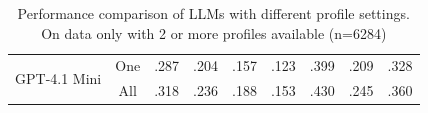 \begin{table}
\begin{tabular}{lcccccccc}
\midrule
\multirow{2}{*}{GPT-4.1 Mini}  
 & \cellcolor{lightgreen}One & \cellcolor{lightgreen}.287 & \cellcolor{lightgreen}.204 & \cellcolor{lightgreen}.157 & \cellcolor{lightgreen}.123 & \cellcolor{lightgreen}.399 & \cellcolor{lightgreen}.209 & \cellcolor{lightgreen}.328 \\ 
 & \cellcolor{darkgreen}All & \cellcolor{darkgreen}.318 & \cellcolor{darkgreen}.236 & \cellcolor{darkgreen}.188 & \cellcolor{darkgreen}.153 & \cellcolor{darkgreen}.430 & \cellcolor{darkgreen}.245 & \cellcolor{darkgreen}.360 \\ 
\bottomrule
\end{tabular}
\caption{Performance comparison of LLMs with different profile settings. On data only with 2 or more profiles available (n=6284)}
\label{tab:main-result-2more}
\end{table}